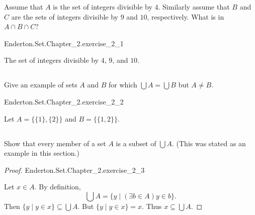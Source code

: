 \documentclass{report}
\begin{document}
Assume that $A$ is the set of integers divisible by $4$.
Similarly assume that $B$ and $C$ are the sets of integers divisible by $9$ and
  $10$, respectively.
What is in $A \cap B \cap C$?

\begin{answer}

    {Enderton.Set.Chapter\_2.exercise\_2\_1}

  The set of integers divisible by $4$, $9$, and $10$.

\end{answer}

\subsection{}%
\label{sub:exercise-2.2}

Give an example of sets $A$ and $B$ for which $\bigcup A = \bigcup B$ but
  $A \neq B$.

\begin{answer}

    {Enderton.Set.Chapter\_2.exercise\_2\_2}

  Let $A = \{\{1\}, \{2\}\}$ and $B = \{\{1, 2\}\}$.

\end{answer}

\subsection{}%
\label{sub:exercise-2.3}

Show that every member of a set $A$ is a subset of $\bigcup A$.
(This was stated as an example in this section.)

\begin{proof}

    {Enderton.Set.Chapter\_2.exercise\_2\_3}

  Let $x \in A$.
  By definition, $$\bigcup A = \{ y \mid (\exists b \in A) y \in b\}.$$
  Then $\{ y \mid y \in x\} \subseteq \bigcup A$.
  But $\{ y \mid y \in x\} = x$.
  Thus $x \subseteq \bigcup A$.

\end{proof}

\subsection{}%
\label{sub:exercise-2.4}
\end{document}
